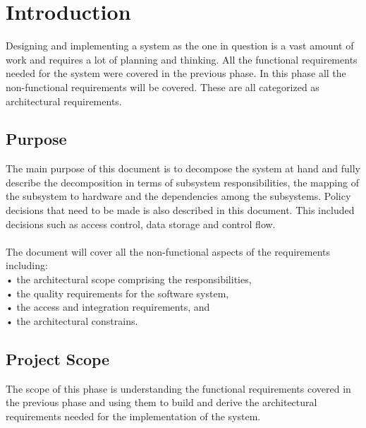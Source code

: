 \documentclass[a4paper,12pt]{report}
\begin{document}
\newpage
\section{Introduction}
Designing and implementing a system as the one in question is a vast amount of work and requires a lot of planning and thinking. All the functional requirements needed for the system were covered in the previous phase. In this phase all the non-functional requirements will be covered. These are all categorized as architectural requirements.  \\
\subsection{Purpose}
The main purpose of this document is to decompose the system at hand and fully describe the decomposition in terms of subsystem responsibilities, the mapping of the subsystem to hardware and the dependencies among the subsystems. Policy decisions that need to be made is also described in this document. This included decisions such as access control, data storage and control flow.\\\\
The document will cover all the non-functional aspects of the requirements including:\\
•	the architectural scope comprising the responsibilities,\\
•	the quality requirements for the software system,\\
•	the access and integration requirements, and\\
•	the architectural constrains. \\

\subsection{Project Scope}
The scope of this phase is understanding the functional requirements covered in the previous phase and using them to build and derive the architectural requirements needed for the implementation of the system.\\

\newpage
\end{document}
